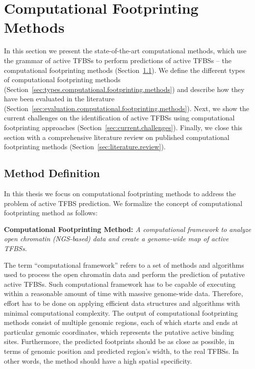 \section{Computational Footprinting Methods}
\label{sec:computational.footprinting.methods}

In this section we present the state-of-the-art computational methods, which use the grammar of active TFBSs to perform predictions of active TFBSs -- the computational footprinting methods (Section~\ref{sec:method.definition}). We define the different types of computational footprinting methods (Section~\ref{sec:types.computational.footprinting.methods}) and describe how they have been evaluated in the literature (Section~\ref{sec:evaluation.computational.footprinting.methods}). Next, we show the current challenges on the identification of active TFBSs using computational footprinting approaches (Section~\ref{sec:current.challenges}). Finally, we close this section with a comprehensive literature review on published computational footprinting methods (Section~\ref{sec:literature.review}).

\subsection{Method Definition}
\label{sec:method.definition}

In this thesis we focus on computational footprinting methods to address the problem of active TFBS prediction. We formalize the concept of computational footprinting method as follows:

\vspace{0.5cm}
\noindent
\textbf{Computational Footprinting Method:} \emph{A computational framework to analyze open chromatin (NGS-based) data and create a genome-wide map of active TFBSs.}
\vspace{0.45cm}

The term ``computational framework'' refers to a set of methods and algorithms used to process the open chromatin data and perform the prediction of putative active TFBSs. Such computational framework has to be capable of executing within a reasonable amount of time with massive genome-wide data. Therefore, effort has to be done on applying efficient data structures and algorithms with minimal computational complexity. The output of computational footprinting methods consist of multiple genomic regions, each of which starts and ends at particular genomic coordinates, which represents the putative active binding sites. Furthermore, the predicted footprints should be as close as possible, in terms of genomic position and predicted region's width, to the real TFBSs. In other words, the method should have a high spatial specificity.

